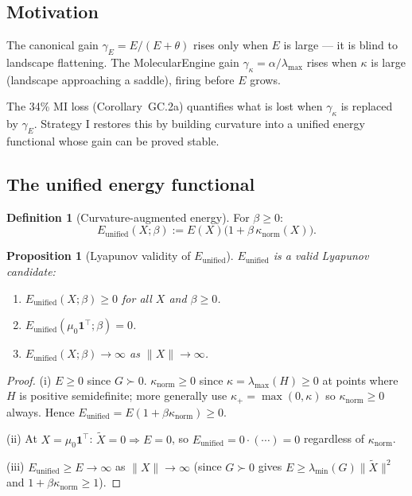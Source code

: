 \documentclass[11pt,a4paper]{article}
\newtheorem{proposition}[theorem]{Proposition}
\theoremstyle{definition}
\newtheorem{definition}[theorem]{Definition}
\begin{document}
\subsection{Motivation}

The canonical gain $\gamma_E = E/(E+\theta)$ rises only when
$E$ is large --- it is blind to landscape flattening.
The MolecularEngine gain $\gamma_\kappa = \alpha/\lambda_\mathrm{max}$
rises when $\kappa$ is large (landscape approaching a saddle),
firing before $E$ grows.

The 34\% MI loss (Corollary~GC.2a) quantifies what is lost
when $\gamma_\kappa$ is replaced by $\gamma_E$.
Strategy I restores this by building curvature into
a unified energy functional whose gain can be proved stable.

\subsection{The unified energy functional}

\begin{definition}[Curvature-augmented energy]
\label{def:E_unified}
For $\beta \geq 0$:
\[
E_\mathrm{unified}(X;\beta) := E(X)\bigl(1 + \beta\,\kappa_\mathrm{norm}(X)\bigr).
\]
\end{definition}

\begin{proposition}[Lyapunov validity of $E_\mathrm{unified}$]
\label{prop:lyap_unified}
$E_\mathrm{unified}$ is a valid Lyapunov candidate:
\begin{enumerate}[label=(\roman*)]
\item $E_\mathrm{unified}(X;\beta) \geq 0$ for all $X$ and $\beta \geq 0$.
\item $E_\mathrm{unified}(\mu_0\mathbf{1}^\top;\beta) = 0$.
\item $E_\mathrm{unified}(X;\beta) \to \infty$ as $\|X\|\to\infty$.
\end{enumerate}
\end{proposition}

\begin{proof}
(i) $E \geq 0$ since $G \succ 0$.
$\kappa_\mathrm{norm} \geq 0$ since $\kappa = \lambda_\mathrm{max}(H) \geq 0$
at points where $H$ is positive semidefinite; more generally
use $\kappa_+ = \max(0,\kappa)$ so $\kappa_\mathrm{norm} \geq 0$ always.
Hence $E_\mathrm{unified} = E(1+\beta\kappa_\mathrm{norm}) \geq 0$.

(ii) At $X = \mu_0\mathbf{1}^\top$: $\tilde X = 0 \Rightarrow E = 0$,
so $E_\mathrm{unified} = 0 \cdot (\cdots) = 0$ regardless of $\kappa_\mathrm{norm}$.

(iii) $E_\mathrm{unified} \geq E \to \infty$ as $\|X\|\to\infty$
(since $G\succ 0$ gives $E \geq \lambda_\mathrm{min}(G)\|\tilde X\|^2$
and $1 + \beta\kappa_\mathrm{norm} \geq 1$).
\end{proof}
\end{document}
